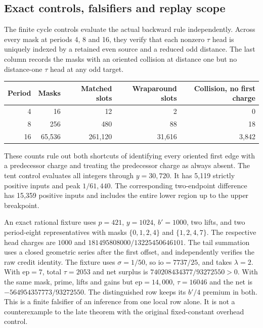 \documentclass[12pt,letterpaper]{article}
\begin{document}
\subsection{Exact controls, falsifiers and replay scope}

The finite cycle controls evaluate the actual backward rule independently. Across every mask at periods 4, 8 and 16, they verify that each nonzero \(\tau\) head is uniquely indexed by a retained even source and a reduced odd distance. The last column records the masks with an oriented collision at distance one but no distance-one \(\tau\) head at any odd target.
\begin{center}
\begin{tabular}{@{}rrrrr@{}}
\toprule
Period&Masks&Matched slots&Wraparound slots&Collision, no first charge\\
\midrule
4&16&12&2&0\\
8&256&480&88&18\\
16&65,536&261,120&31,616&3,842\\
\bottomrule
\end{tabular}
\end{center}
These counts rule out both shortcuts of identifying every oriented first edge with a predecessor charge and treating the predecessor charge as always absent. The tent control evaluates all integers through \(y=30{,}720\). It has 5,119 strictly positive inputs and peak \(1/61{,}440\). The corresponding two-endpoint difference has 15,359 positive inputs and includes the entire lower region up to the upper breakpoint.

An exact rational fixture uses \(p=421\), \(y=1024\), \(b'=1000\), two lifts, and two period-eight representatives with masks \(\{0,1,2,4\}\) and \(\{1,2,4,7\}\). The respective head charges are \(1000\) and \(181495808000/13225450646101\). The tail summation uses a closed geometric series after the first offset, and independently verifies the raw credit identity. The fixture uses \(\sigma=1/50\), so \(\mathrm{io}=7737/25\), and takes \(\lambda=2\). With \(\mathrm{ep}=7\), total \(\tau=2053\) and net surplus is \(740208434377/93272550>0\). With the same mask, prime, lifts and gains but \(\mathrm{ep}=14{,}000\), \(\tau=16046\) and the net is \(-564954357773/93272550\). The distinguished row keeps its \(b'/4\) premium in both. This is a finite falsifier of an inference from one local row alone. It is not a counterexample to the late theorem with the original fixed-constant overhead control.
\end{document}
